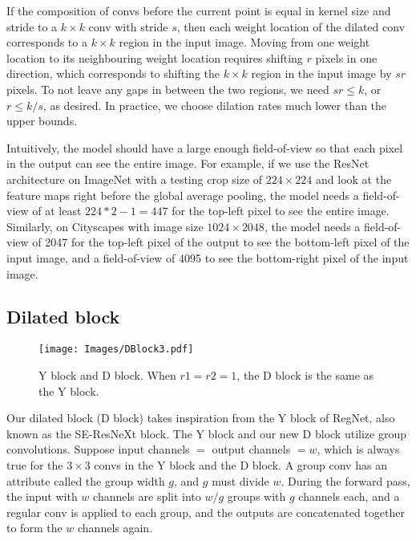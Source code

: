 \documentclass[10pt,twocolumn,letterpaper]{article}
\begin{document}
If the composition of convs before the current point is equal in kernel size and stride to a $k\times k$ conv with stride $s$, then each weight location of the dilated conv corresponds to a $k\times k$ region in the input image. Moving from one weight location to its neighbouring weight location requires shifting $r$ pixels in one direction, which corresponds to shifting the $k\times k$ region in the input image by $sr$ pixels. To not leave any gaps in between the two regions, we need $sr\leq k$, or $r\leq k/s$, as desired. In practice, we choose dilation rates much lower than the upper bounds.

Intuitively, the model should have a large enough field-of-view so that each pixel in the output can see the entire image. For example, if we use the ResNet\cite{resnet} architecture on ImageNet with a testing crop size of $224\times 224$ and look at the feature maps right before the global average pooling, the model needs a field-of-view of at least $224*2-1=447$ for the top-left pixel to see the entire image. Similarly, on Cityscapes with image size $1024\times 2048$, the model needs a field-of-view of 2047 for the top-left pixel of the output to see the bottom-left pixel of the input image, and a field-of-view of 4095 to see the bottom-right pixel of the input image. 



\subsection{Dilated block}
\begin{figure}
  \centering
    \texttt{[image: Images/DBlock3.pdf]}

   \caption{Y block and D block. When $r1=r2=1$, the D block is the same as the Y block.}
   \label{fig:D block}
\end{figure}



Our dilated block (D block) takes inspiration from the Y block of RegNet\cite{regnet}, also known as the SE-ResNeXt block\cite{hu2018squeeze}. The Y block and our new D block utilize group convolutions. Suppose input channels $=$ output channels $=w$, which is always true for the $3\times 3$ convs in the Y block and the D block. A group conv has an attribute called the group width $g$, and $g$ must divide $w$. During the forward pass, the input with $w$ channels are split into $w/g$ groups with $g$ channels each, and a regular conv is applied to each group, and the outputs are concatenated together to form the $w$ channels again.
\end{document}

